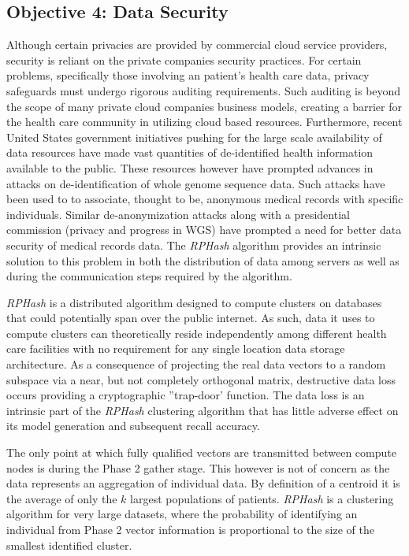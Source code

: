 \documentclass[a4paper,10pt]{article}
\begin{document}
\subsection{Objective 4: Data Security} Although certain privacies are provided
by commercial cloud service providers, security is reliant on the private
companies security practices.  For certain problems, specifically those
involving an patient's health care data, privacy safeguards must undergo
rigorous auditing requirements.  Such auditing is beyond the scope of many
private cloud companies business models, creating a barrier for the health
care community in utilizing cloud based resources.  Furthermore, recent United
States government initiatives pushing for the large scale availability of
data resources have made vast quantities of de-identified health information
available to the public.  These resources however have prompted advances in
attacks on de-identification of whole genome sequence data.  Such attacks
have been used to to associate, thought to be, anonymous medical records
with specific individuals\cite{deident}.  Similar de-anonymization attacks
\cite{deanon1,deanon2} along with a presidential commission (privacy and
progress in WGS) have prompted a need for better data security of medical
records data.  The \emph{RPHash} algorithm provides an intrinsic solution
to this problem in both the distribution of data among servers as well as
during the communication steps required by the algorithm.

\emph{RPHash} is a distributed algorithm designed to compute clusters on
databases that could potentially span over the public internet.
 As such, data it uses to
compute clusters can theoretically reside independently among different health
care facilities with no requirement for any single location data storage
architecture.  As a consequence of projecting the real data vectors to a
random subspace via a near, but not completely orthogonal matrix, destructive
data loss occurs providing a cryptographic ''trap-door' function.  The data
loss is an intrinsic part of the \emph{RPHash} clustering algorithm that has
little adverse effect on its model generation and subsequent recall accuracy.

The only point at which fully qualified vectors are transmitted between compute
nodes is during the Phase 2 gather stage.  This however is not of concern as
the data represents an aggregation of individual data.	By definition of a
centroid it is the average of only the $k$ largest populations of patients.
\emph{RPHash} is a clustering algorithm for very large datasets, where the
probability of identifying an individual from Phase 2 vector
 information is proportional to the size of the smallest identified cluster.
\end{document}
